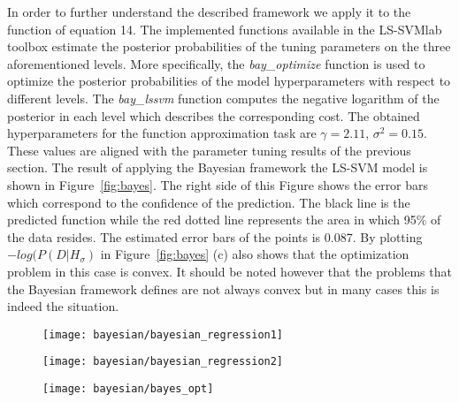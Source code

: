 \documentclass[conference,compsoc]{IEEEtran}
\begin{document}
In order to further understand the described framework we apply it to the function of equation 14. The implemented functions available in the LS-SVMlab toolbox estimate the posterior probabilities of the tuning parameters on the three aforementioned levels. More specifically, the \textit{bay\_optimize} function is used to optimize the posterior probabilities of the model hyperparameters with respect to different levels. The \textit{bay\_lssvm} function computes the negative logarithm of the posterior in each level which describes the corresponding cost. The obtained hyperparameters for the function approximation task are $\gamma=2.11$, $\sigma^2=0.15$. These values are aligned with the parameter tuning results of the previous section. The result of applying the Bayesian framework the LS-SVM model is shown in Figure~\ref{fig:bayes}. The right side of this Figure shows the error bars which correspond to the confidence of the prediction. The black line is the predicted function while the red dotted line represents the area in which 95\% of the data resides. The estimated error bars of the points is 0.087. By plotting $-log(P(D|H_\sigma)$ in Figure~\ref{fig:bayes} (c) also shows that the optimization problem in this case is convex. It should be noted however that the problems that the Bayesian framework defines are not always convex but in many cases this is indeed the situation.


\begin{figure*}[]
        \begin{subfigure}{0.45\linewidth}
            \texttt{[image: bayesian/bayesian\_regression1]}
            \caption{}
        \end{subfigure}
                \begin{subfigure}{0.45\linewidth}
            \texttt{[image: bayesian/bayesian\_regression2]}
            \caption{}
        \end{subfigure}
                \centering
        \begin{subfigure}{0.45\linewidth}
            \texttt{[image: bayesian/bayes\_opt]}
            \caption{}
        \end{subfigure}
                  
\caption{Applying the Bayesian framework for the function approximation task}        
        
             
        \label{fig:bayes}
    \end{figure*}

\end{document}
